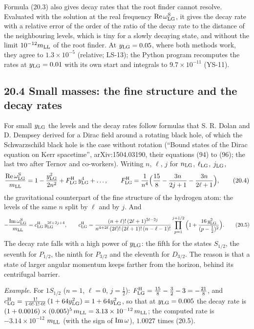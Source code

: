 \documentclass[
  10pt,
]{article}
\begin{document}
Formula (20.3) also gives decay rates that the root finder cannot
resolve. Evaluated with the solution at the real frequency
\({\rm Re}\,\omega^{\rm S}_{\rm LG}\), it gives the decay rate with a
relative error of the order of the ratio of the decay rate to the
distance of the neighbouring levels, which is tiny for a slowly decaying
state, and without the limit \(10^{-12}m_{\rm LL}\) of the root finder.
At \(y_{\rm LG}=0.05\), where both methods work, they agree to
\(1.3\times10^{-5}\) (relative; LS-13); the Python program recomputes
the rates at \(y_{\rm LG}=0.01\) with its own start and integrals to
\(9.7\times10^{-11}\) (YS-11).

\hypertarget{small-masses-the-fine-structure-and-the-decay-rates}{%
\subsection{20.4 Small masses: the fine structure and the decay
rates}\label{small-masses-the-fine-structure-and-the-decay-rates}}

For small \(y_{\rm LG}\) the levels and the decay rates follow formulas
that S. R. Dolan and D. Dempsey derived for a Dirac field around a
rotating black hole, of which the Schwarzschild black hole is the case
without rotation (``Bound states of the Dirac equation on Kerr
spacetime'', arXiv:1504.03190, their equations (94) to (96); the last
two after Ternov and co-workers). Writing \(n\), \(\ell\), \(j\) for
\(n_{\rm LG}\), \(\ell_{\rm LG}\), \(j_{\rm LG}\),
\[\frac{{\rm Re}\,\omega^{\rm S}_{\rm LG}}{m_{\rm LL}}=1-\frac{y_{\rm LG}^2}{2n^2}+F^{\rm H}_{\rm LG}\,y_{\rm LG}^4+\dots,\qquad F^{\rm H}_{\rm LG}=\frac1{n^4}\Big(\frac{15}8-\frac{3n}{2j+1}-\frac{3n}{2\ell+1}\Big),\tag{20.4}\]
the gravitational counterpart of the fine structure of the hydrogen
atom: the levels of the same \(n\) split by \(\ell\) and by \(j\). And
\[-\frac{{\rm Im}\,\omega^{\rm S}_{\rm LG}}{m_{\rm LL}}=c^{\rm H}_{\rm LG}\,y_{\rm LG}^{2\ell+2j+4},\qquad c^{\rm H}_{\rm LG}=\frac{(n+\ell)!\,(2\ell+1)^{2\ell-2j}}{n^{4+2\ell}\,(2\ell)!\,(2\ell+1)!\,(n-\ell-1)!}\prod_{p=1}^{j+1/2}\Big(1+\frac{16\,y_{\rm LG}^2}{(p-\frac12)^2}\Big).\tag{20.5}\]
The decay rate falls with a high power of \(y_{\rm LG}\): the fifth for
the states \(S_{1/2}\), the seventh for \(P_{1/2}\), the ninth for
\(P_{3/2}\) and the eleventh for \(D_{3/2}\). The reason is that a state
of larger angular momentum keeps farther from the horizon, behind its
centrifugal barrier.

\emph{Example.} For \(1S_{1/2}\) (\(n=1\), \(\ell=0\), \(j=\tfrac12\)):
\(F^{\rm H}_{\rm LG}=\tfrac{15}8-\tfrac32-3=-\tfrac{21}8\), and
\(c^{\rm H}_{\rm LG}=\tfrac{1!}{1\cdot0!\cdot1!\cdot0!}\,(1+64y_{\rm LG}^2)=1+64y_{\rm LG}^2\),
so that at \(y_{\rm LG}=0.005\) the decay rate is
\((1+0.0016)\times(0.005)^5\,m_{\rm LL}=3.13\times10^{-12}\,m_{\rm LL}\);
the computed rate is \(-3.14\times10^{-12}\) \(m_{\rm LL}\) (with the
sign of \({\rm Im}\,\omega\)), \(1.0027\) times (20.5).
\end{document}
